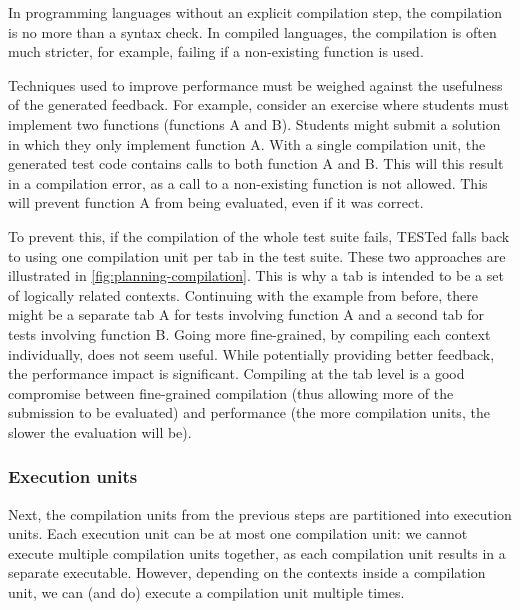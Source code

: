 \documentclass[../main]{subfiles}
\begin{document}
In programming languages without an explicit compilation step, the compilation is no more than a syntax check.
In compiled languages, the compilation is often much stricter, for example, failing if a non-existing function is used.

Techniques used to improve performance must be weighed against the usefulness of the generated feedback.
For example, consider an exercise where students must implement two functions (functions A and B).
Students might submit a solution in which they only implement function A\@.
With a single compilation unit, the generated test code contains calls to both function A and B\@.
This will this result in a compilation error, as a call to a non-existing function is not allowed.
This will prevent function A from being evaluated, even if it was correct.

To prevent this, if the compilation of the whole test suite fails, TESTed falls back to using one compilation unit per tab in the test suite.
These two approaches are illustrated in \cref{fig:planning-compilation}.
This is why a tab is intended to be a set of logically related contexts.
Continuing with the example from before, there might be a separate tab A for tests involving function A and a second tab for tests involving function B\@.
Going more fine-grained, by compiling each context individually, does not seem useful.
While potentially providing better feedback, the performance impact is significant.
Compiling at the tab level is a good compromise between fine-grained compilation (thus allowing more of the submission to be evaluated) and performance (the more compilation units, the slower the evaluation will be).

\subsubsection{Execution units}

Next, the compilation units from the previous steps are partitioned into execution units.
Each execution unit can be at most one compilation unit: we cannot execute multiple compilation units together,
as each compilation unit results in a separate executable.
However, depending on the contexts inside a compilation unit, we can (and do) execute a compilation unit multiple times.
\end{document}
